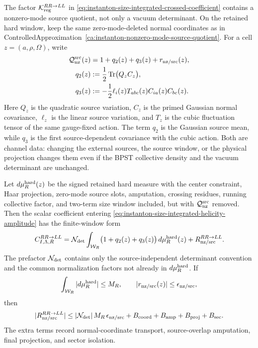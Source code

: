 \begin{controlledapproximation}
\label{ca:instanton-retained-hard-normal-source-quotient}
The factor \(\mathcal K_{\rm reg}^{RR\to LL}\) in
\eqref{eq:instanton-size-integrated-crossed-coefficient} contains a
nonzero-mode source quotient, not only a vacuum determinant.  On the retained
hard window, keep the same zero-mode-deleted normal coordinates as in
ControlledApproximation~\ref{ca:instanton-nonzero-mode-source-quotient}.  For a
cell \(z=(a,\rho,\Omega)\), write
\begin{equation}
\begin{aligned}
  \mathcal Q_{\rm nz}^{\rm src}(z)
  &=
  1+q_2(z)+q_3(z)+r_{\rm nz/src}(z),                 \\
  q_2(z)
  &:=
  \frac12\operatorname{Tr}\bigl(Q_zC_z\bigr),        \\
  q_3(z)
  &:=
  -\frac12\ell_i(z)T_{abc}(z)C_{ia}(z)C_{bc}(z).
\end{aligned}
  \label{eq:instanton-retained-hard-normal-source-quotient}
\end{equation}
Here \(Q_z\) is the quadratic source variation, \(C_z\) is the primed Gaussian
normal covariance, \(\ell_z\) is the linear source variation, and \(T_z\) is the
cubic fluctuation tensor of the same gauge-fixed action.  The term \(q_2\) is
the Gaussian source mean, while \(q_3\) is the first source-dependent covariance
with the cubic action.  Both are channel data: changing the external sources,
the source window, or the physical projection changes them even if the BPST
collective density and the vacuum determinant are unchanged.

Let \(d\mu_R^{\rm hard}(z)\) be the signed retained hard measure with the
center constraint, Haar projection, zero-mode source slots, amputation,
crossing residues, running collective factor, and two-term size window included,
but with \(\mathcal Q_{\rm nz}^{\rm src}\) removed.  Then the scalar coefficient
entering \eqref{eq:instanton-size-integrated-helicity-amplitude} has the
finite-window form
\begin{equation}
  C_{I,\Lambda,R}^{RR\to LL}
  =
  \mathcal N_{\rm det}
  \int_{\mathcal W_R}
  \bigl(1+q_2(z)+q_3(z)\bigr)\,
  d\mu_R^{\rm hard}(z)
  +R_{\rm nz/src}^{RR\to LL}.
  \label{eq:instanton-retained-hard-normal-source-coefficient}
\end{equation}
The prefactor \(\mathcal N_{\rm det}\) contains only the source-independent
determinant convention and the common normalization factors not already in
\(d\mu_R^{\rm hard}\).  If
\[
  \int_{\mathcal W_R}|d\mu_R^{\rm hard}|\le M_R,
  \qquad
  |r_{\rm nz/src}(z)|\le\epsilon_{\rm nz/src},
\]
then
\begin{equation}
  |R_{\rm nz/src}^{RR\to LL}|
  \le
  |\mathcal N_{\rm det}|\,M_R\,\epsilon_{\rm nz/src}
  +B_{\rm coord}+B_{\rm amp}+B_{\rm proj}+B_{\rm sec}.
  \label{eq:instanton-retained-hard-normal-source-bound}
\end{equation}
The extra terms record normal-coordinate transport, source-overlap amputation,
final projection, and sector isolation.


\end{controlledapproximation}
